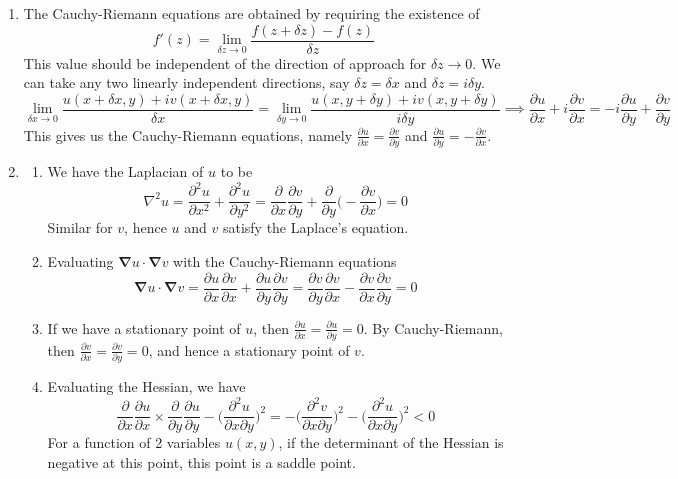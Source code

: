 \documentclass[a4paper]{article}
\begin{document}
\begin{ans}\leavevmode
\begin{enumerate}[label=(\alph*)]
\item The Cauchy-Riemann equations are obtained by requiring the existence of $$f'(z)=\lim_{\delta z\rightarrow0}\frac{f(z+\delta z)-f(z)}{\delta z}$$ This value should be independent of the direction of approach for $\delta z\rightarrow 0$. We can take any two linearly independent directions, say $\delta z=\delta x$ and $\delta z=i\delta y$. 
$$\lim_{\delta x\rightarrow0}\frac{u(x+\delta x,y)+iv(x+\delta x,y)}{\delta x}=\lim_{\delta y\rightarrow0}\frac{u(x,y+\delta y)+iv(x,y+\delta y)}{i\delta y}\implies\frac{\partial u}{\partial x}+i\frac{\partial v}{\partial x}=-i\frac{\partial u}{\partial y}+\frac{\partial v}{\partial y}$$
This gives us the Cauchy-Riemann equations, namely $\frac{\partial u}{\partial x}=\frac{\partial v}{\partial y}$ and $\frac{\partial u}{\partial y}=-\frac{\partial v}{\partial x}$.
\item
\begin{enumerate}[label=(\roman*)]
\item We have the Laplacian of $u$ to be
$$\nabla^2u=\frac{\partial^2u}{\partial x^2}+\frac{\partial^2u}{\partial y^2}=\frac{\partial}{\partial x}\frac{\partial v}{\partial y}+\frac{\partial}{\partial y}\bigg(-\frac{\partial v}{\partial x}\bigg)=0$$
Similar for $v$, hence $u$ and $v$ satisfy the Laplace's equation.
\item Evaluating $\boldsymbol{\nabla}u\cdot\boldsymbol{\nabla}v$ with the Cauchy-Riemann equations
$$\boldsymbol{\nabla}u\cdot\boldsymbol{\nabla}v=\frac{\partial u}{\partial x}\frac{\partial v}{\partial x}+\frac{\partial u}{\partial y}\frac{\partial v}{\partial y}=\frac{\partial v}{\partial y}\frac{\partial v}{\partial x}-\frac{\partial v}{\partial x}\frac{\partial v}{\partial y}=0$$
\item If we have a stationary point of $u$, then $\frac{\partial u}{\partial x}=\frac{\partial u}{\partial y}=0$. By Cauchy-Riemann, then $\frac{\partial v}{\partial x}=\frac{\partial v}{\partial y}=0$, and hence a stationary point of $v$.
\item Evaluating the Hessian, we have
$$\frac{\partial}{\partial x}\frac{\partial u}{\partial x}\times\frac{\partial}{\partial y}\frac{\partial u}{\partial y}-\bigg(\frac{\partial^2u}{\partial x\partial y}\bigg)^2=-\bigg(\frac{\partial^2v}{\partial x\partial y}\bigg)^2-\bigg(\frac{\partial^2u}{\partial x\partial y}\bigg)^2<0$$
For a function of 2 variables $u(x,y)$, if the determinant of the Hessian is negative at this point, this point is a saddle point.

\end{enumerate}
\end{enumerate}
\end{ans}
\end{document}
